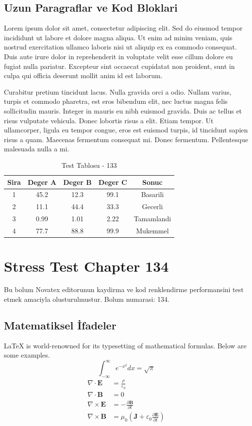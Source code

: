 \documentclass[12pt,a4paper]{article}
\begin{document}
\subsection{Uzun Paragraflar ve Kod Bloklari}
Lorem ipsum dolor sit amet, consectetur adipiscing elit. Sed do eiusmod tempor incididunt ut labore et dolore magna aliqua. Ut enim ad minim veniam, quis nostrud exercitation ullamco laboris nisi ut aliquip ex ea commodo consequat. Duis aute irure dolor in reprehenderit in voluptate velit esse cillum dolore eu fugiat nulla pariatur. Excepteur sint occaecat cupidatat non proident, sunt in culpa qui officia deserunt mollit anim id est laborum.

Curabitur pretium tincidunt lacus. Nulla gravida orci a odio. Nullam varius, turpis et commodo pharetra, est eros bibendum elit, nec luctus magna felis sollicitudin mauris. Integer in mauris eu nibh euismod gravida. Duis ac tellus et risus vulputate vehicula. Donec lobortis risus a elit. Etiam tempor. Ut ullamcorper, ligula eu tempor congue, eros est euismod turpis, id tincidunt sapien risus a quam. Maecenas fermentum consequat mi. Donec fermentum. Pellentesque malesuada nulla a mi.

\begin{table}[h!]
\centering
\begin{tabular}{|c|c|c|c|c|}
\hline
\textbf{Sira} & \textbf{Deger A} & \textbf{Deger B} & \textbf{Deger C} & \textbf{Sonuc} \\
\hline
1 & 45.2 & 12.3 & 99.1 & Basarili \\
2 & 11.1 & 44.4 & 33.3 & Gecerli \\
3 & 0.99 & 1.01 & 2.22 & Tamamlandi \\
4 & 77.7 & 88.8 & 99.9 & Mukemmel \\
\hline
\end{tabular}
\caption{Test Tablosu - 133}
\end{table}

\newpage
\section{Stress Test Chapter 134}
Bu bolum Novatex editorunun kaydirma ve kod renklendirme performansini test etmek amaciyla olusturulmustur. Bolum numarasi: 134.

\subsection{Matematiksel İfadeler}
\LaTeX{} is world-renowned for its typesetting of mathematical formulas. Below are some examples.
\begin{equation}
\int_{-\infty}^{\infty} e^{-x^2} dx = \sqrt{\pi}
\end{equation}
\begin{align}
\nabla \cdot \mathbf{E} &= \frac{\rho}{\varepsilon_0} \\
\nabla \cdot \mathbf{B} &= 0 \\
\nabla \times \mathbf{E} &= -\frac{\partial \mathbf{B}}{\partial t} \\
\nabla \times \mathbf{B} &= \mu_0\left(\mathbf{J} + \varepsilon_0 \frac{\partial \mathbf{E}}{\partial t}\right)
\end{align}
\end{document}
